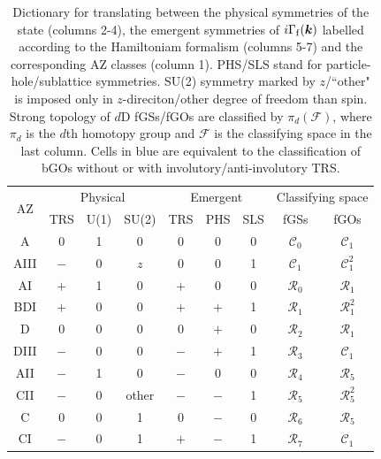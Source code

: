 \documentclass[prl,twocolumn,preprintnumbers,superscriptaddress,amsmath,amssymb]{revtex4-1}
\begin{document}
\begin{table}[tbp]
\caption{Dictionary for translating between the physical symmetries of the state (columns 2-4), the emergent symmetries of $i\Gamma_{\rm f}(\boldsymbol{k})$ labelled according to the Hamiltoniam formalism (columns 5-7) and the corresponding AZ classes (column 1).
PHS/SLS stand for particle-hole/sublattice symmetries. SU(2) symmetry marked by $z$/``other" is imposed only in $z$-direciton/other degree of freedom than spin.
Strong topology  of $d$D fGSs/fGOs are classified by $\pi_d(\mathcal{F})$, where $\pi_d$ is the $d$th homotopy group and $\mathcal{F}$ is the classifying space in the last column.
Cells in blue are equivalent to the classification of bGOs without or with involutory/anti-involutory TRS.} 
\begin{center}
\begin{tabular}{c|ccc|ccc|cc}
\hline\hline
\multirow{2}{*}{\;AZ} & \multicolumn{3}{c|}{Physical}   & \multicolumn{3}{c|}{Emergent} & \multicolumn{2}{c}{\;Classifying space}\\
  & \;TRS\; & \;U(1)\; & \;SU(2)\; & \;TRS\; & PHS & \;SLS\; & \; fGSs & \; fGOs \\
\hline
\colorbox{blue!10!white}{A} &  \colorbox{blue!10!white}{0} & 1 & 0 & 0 & 0 & 0 & $\mathcal{C}_0$ &  \colorbox{blue!10!white}{$\mathcal{C}_1$} \\
AIII & $-$ & 0 & $z$ & 0 & 0 & 1 & $\mathcal{C}_1$ & $\mathcal{C}_1^2$ \\
\hline
\colorbox{blue!10!white}{AI} & \colorbox{blue!10!white}{$+$} & 1 & 0 & $+$ & 0 & 0 & $\mathcal{R}_0$ & \colorbox{blue!10!white}{$\mathcal{R}_1$} \\
BDI & $+$ & 0 & 0 & $+$ & $+$ & 1 & $\mathcal{R}_1$ & $\mathcal{R}_1^2$ \\
D & 0 & 0 & 0 & 0 & $+$ & 0 & $\mathcal{R}_2$ & $\mathcal{R}_1$  \\
DIII & $-$ & 0 & 0 & $-$ & $+$ & 1 & $\mathcal{R}_3$ & $\mathcal{C}_1$  \\
\colorbox{blue!10!white}{AII} & \colorbox{blue!10!white}{$-$} & 1 & 0 & $-$ & 0 & 0 & $\mathcal{R}_4$ & \colorbox{blue!10!white}{$\mathcal{R}_5$} \\
CII & $-$ & 0 & other & $-$ & $-$ & 1 & $\mathcal{R}_5$ & $\mathcal{R}_5^2$ \\
C & 0 & 0 & 1 & 0 & $-$ & 0 & $\mathcal{R}_6$ & $\mathcal{R}_5$  \\
CI & $-$ & 0 & 1 & $+$ & $-$ & 1 & $\mathcal{R}_7$ & $\mathcal{C}_1$  \\
\hline\hline
\end{tabular}
\end{center}
\label{table1}
\end{table}
\end{document}
